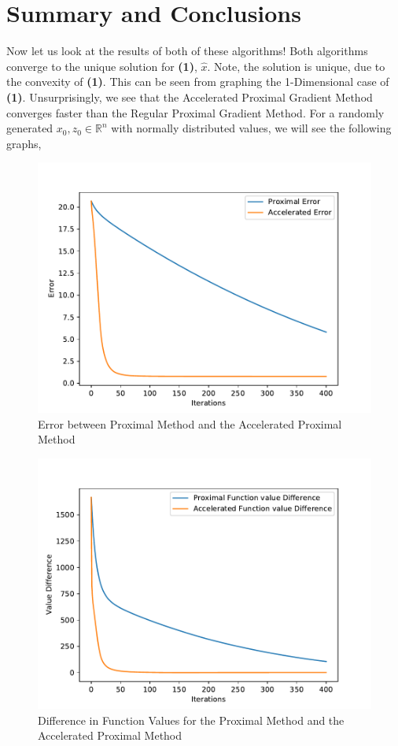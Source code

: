 \documentclass{article}
\renewcommand{\reals}{\mathbb{R}}
\begin{document}
\section{Summary and Conclusions}
Now let us look at the results of both of these algorithms! Both algorithms converge to the unique solution for \textbf{(1)}, $\hat{x}$. Note, the solution is unique, due to the convexity of \textbf{(1)}. This can be seen from graphing the 1-Dimensional case of \textbf{(1)}. Unsurprisingly, we see that the Accelerated Proximal Gradient Method converges faster than the Regular Proximal Gradient Method.  For a randomly generated $x_{0}, z_{0} \in \reals^{n}$ with normally distributed values, we will see the following graphs,

\begin{figure}[hbp]
    \centering
    \includegraphics[width=120mm]{Error.pdf}
    \caption{Error between Proximal Method and the Accelerated Proximal Method}
    \label{fig:fig 1}
\end{figure}

\begin{figure}[hbp]
    \centering
    \includegraphics[width=120mm]{Function Difference.pdf}
    \caption{Difference in Function Values for the Proximal Method and the Accelerated Proximal Method}
    \label{fig:my_label}
\end{figure}
\end{document}
